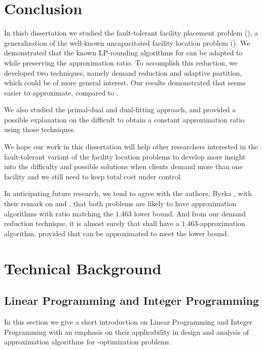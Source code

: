 \documentclass[oneside,final]{ucr}
\begin{document}
\chapter{Conclusion} \label{ch: conclusion} 

In thisb dissertation we studied the fault-tolerant facility
placement problem ({\FTFP}), a generalization of the
well-known uncapacitated facility location problem
({\UFL}). We demonstrated that the known LP-rounding
algorithms for {\UFL} can be adapted to {\FTFP} while
preserving the approximation ratio. To accomplish this
reduction, we developed two techniques, namely demand
reduction and adaptive partition, which could be of more
general interest. Our results demonstrated that {\FTFP}
seems easier to approximate, compared to {\FTFL}.

We also studied the primal-dual and dual-fitting approach,
and provided a possible explanation on the difficult to
obtain a constant approximation ratio using those techniques.

We hope our work in this dissertation will help other
researchers interested in the fault-tolerant variant of the
facility location problems to develop more insight into the
difficulty and possible solutions when clients demand more
than one facility and we still need to keep total cost under
control.

In anticipating future research, we tend to agree with the
authors, Byrka {\etal}, with their remark on {\UFL} and
{\FTFL}, that both problems are likely to have approximation
algorithms with ratio matching the $1.463$ lower bound. And
from our demand reduction technique, it is almost surely
that {\FTFP} shall have a $1.463$-approximation algorithm,
provided that {\FTFL} can be approximated to meet the lower
bound.




\appendix
\chapter{Technical Background}

\section{Linear Programming and Integer Programming}
\label{sec: ILP}

In this section we give a short introduction on Linear
Programming and Integer Programming with an emphasis on
their applicability in design and analysis of approximation
algorithms for {\NP}-optimization problems.
\end{document}
